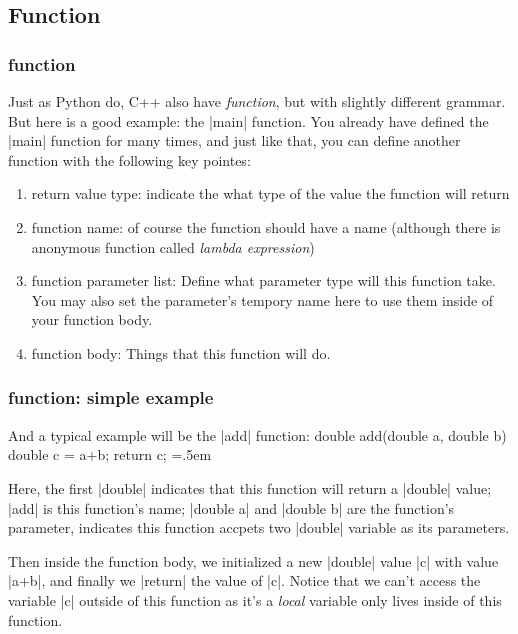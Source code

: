 \documentclass[compress,xcolor={dvipsnames}]{beamer}
\newenvironment{lcverbatim}
 {\SaveVerbatim{cverb}}
 {\endSaveVerbatim
  \flushleft\fboxrule=0pt\fboxsep=.5em
  \colorbox{cverbbg}{%
    \makebox[\dimexpr\linewidth-2\fboxsep][l]{\BUseVerbatim{cverb}}%
  }
  \endflushleft
}
\begin{document}
\subsection{Function}
\begin{frame}[fragile]
    \frametitle{function}

    Just as Python do, C++ also have \emph{function}, but with slightly different grammar. But here is a good example: the \cverb|main| function. You already have defined the \cverb|main| function for many times, and just like that, you can define another function with the following key pointes:

    \begin{enumerate}
        \item return value type: indicate the what type of the value the function will return
        \item function name: of course the function should have a name (although there is anonymous function called \emph{lambda expression})
        \item function parameter list: Define what parameter type will this function take. You may also set the parameter's tempory name here to use them inside of your function body.
        \item function body: Things that this function will do.
    \end{enumerate}
\end{frame}

\begin{frame}[fragile]
    \frametitle{function: simple example}

    And a typical example will be the \cverb|add| function:
    \begin{lcverbatim}
        double add(double a, double b){
                double c = a+b;
                return c;
            }
    \end{lcverbatim}

    Here, the first \cverb|double| indicates that this function will return a \cverb|double| value; \cverb|add| is this function's name; \cverb|double a| and \cverb|double b| are the function's parameter, indicates this function accpets two \cverb|double| variable as its parameters.

    Then inside the function body, we initialized a new \cverb|double| value \cverb|c| with value \cverb|a+b|, and finally we \cverb|return| the value of \cverb|c|. Notice that we can't access the variable \cverb|c| outside of this function as it's a \emph{local} variable only lives inside of this function.
\end{frame}
\end{document}
